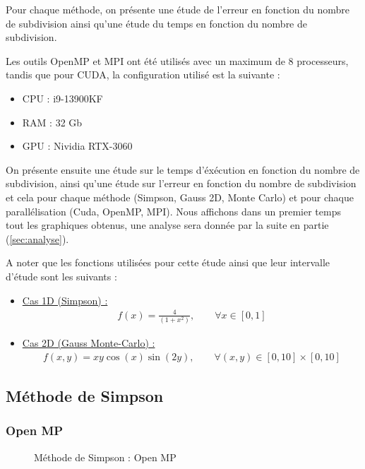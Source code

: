\documentclass[10pt,a4paper]{article}
\begin{document}
Pour chaque méthode, on présente une étude de l'erreur en fonction du nombre de subdivision ainsi qu'une étude du temps en fonction du nombre de subdivision.

Les outils OpenMP et MPI ont été utilisés avec un maximum de 8 processeurs, tandis que pour CUDA, la configuration utilisé est la suivante : 
\begin{itemize}
    \item CPU : i9-13900KF
    \item RAM : 32 Gb
    \item GPU : Nividia RTX-3060
\end{itemize}

On présente ensuite une étude sur le temps d'éxécution en fonction du nombre de subdivision, ainsi qu'une étude sur l'erreur en fonction du nombre de subdivision et cela pour chaque méthode (Simpson, Gauss 2D, Monte Carlo) et pour chaque parallélisation (Cuda, OpenMP, MPI).
Nous affichons dans un premier temps tout les graphiques obtenus, une analyse sera donnée par la suite en partie (\ref{sec:analyse}).

A noter que les fonctions utilisées pour cette étude ainsi que leur intervalle d'étude sont les suivants : 

\begin{itemize}
  \item \underline{Cas 1D (Simpson) :}
  \begin{align*}
    f(x) = \frac{4}{ (1+ x^2)}, \qquad \forall x \in [0,1]
  \end{align*}
  \item \underline{Cas 2D (Gauss Monte-Carlo) :} 
  \begin{align*}
    f(x,y) = x y \cos(x) \sin(2y) , \qquad \forall (x,y) \in [0,10]\times[0,10]
  \end{align*}
\end{itemize}




\subsection{Méthode de Simpson}

\subsubsection{Open MP}


  \begin{figure}[H]
    \centering

    \hfill 
  
    \caption{Méthode de Simpson : Open MP}
    \label{fig:simpMP}
  \end{figure}
\end{document}
